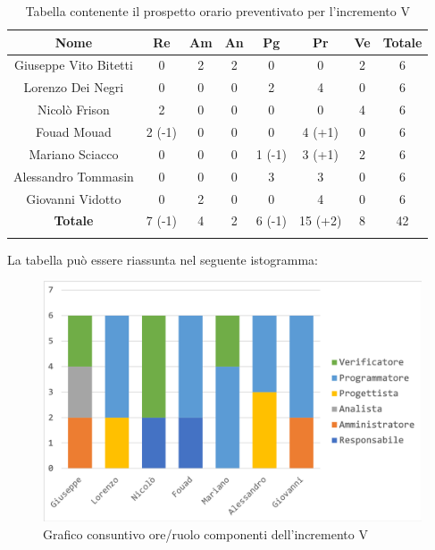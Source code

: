 			\begin{longtable}{|c|c|c|c|c|c|c|c}
				\hline
				\rowcolor{lighter-grayer}
				\textbf{Nome} & \textbf{Re} & \textbf{Am} & \textbf{An} & \textbf{Pg}  & \textbf{Pr}   & \textbf{Ve} & \textbf{Totale} \\
				\hline
				\endfirsthead
				\hline
				Giuseppe Vito Bitetti & 0 & 2 & 2 & 0 & 0 & 2 & 6\\
				\hline
				\hline
				Lorenzo Dei Negri & 0 & 0 & 0 & 2 & 4 & 0 & 6\\
				\hline
				\hline
				Nicolò Frison & 2 & 0 & 0 & 0 & 0 & 4 & 6\\
				\hline
				\hline
				Fouad Mouad & 2 (-1) & 0 & 0 & 0 & 4 (+1) & 0 & 6 \\
				\hline
				\hline
				Mariano Sciacco & 0 & 0 & 0 & 1 (-1) & 3 (+1) & 2 & 6\\
				\hline
				\hline
				Alessandro Tommasin & 0 & 0 & 0 & 3 & 3 & 0 & 6\\
				\hline
				\hline
				Giovanni Vidotto & 0 & 2 & 0 & 0 & 4 & 0 & 6\\
				\hline 
				\textbf{Totale} & 7 (-1) & 4 & 2 & 6 (-1) & 15 (+2) & 8 & 42 \\
				\hline 
				
				\caption{Tabella contenente il prospetto orario preventivato per l'incremento V}
			\end{longtable}
			\pagebreak	
			
			La tabella può essere riassunta nel seguente istogramma:
			
			\begin{figure}[H]
				\centering
				\includegraphics[width=0.8\linewidth]{images/consuntivo/ConsIncr5-1.png}
				\caption{Grafico consuntivo ore/ruolo componenti dell'incremento V}
				\label{fig:consuntivo grafico suddivione ruoli incremento V}
			\end{figure}
			
